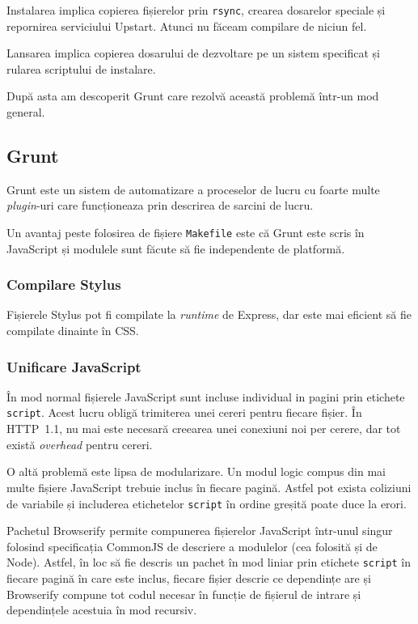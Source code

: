 \documentclass[a4wide,12pt]{report}
\newcommand{\eng}[1]{\emph{#1}} %
\newcommand{\cod}[1]{\texttt{#1}}
\begin{document}
Instalarea implica copierea fișierelor prin \cod{rsync}, crearea dosarelor
speciale și repornirea serviciului Upstart. Atunci nu făceam compilare de niciun
fel.

Lansarea implica copierea dosarului de dezvoltare pe un sistem specificat și
rularea scriptului de instalare.

După asta am descoperit Grunt care rezolvă această problemă într-un mod general.

\subsection{Grunt}

Grunt este un sistem de automatizare a proceselor de lucru cu foarte multe
\eng{plugin}-uri care funcționeaza prin descrirea de sarcini de lucru.

Un avantaj peste folosirea de fișiere \cod{Makefile} este că Grunt este scris în
JavaScript și modulele sunt făcute să fie independente de platformă.

\subsubsection{Compilare Stylus}

Fișierele Stylus pot fi compilate la \eng{runtime} de Express, dar este mai
eficient să fie compilate dinainte în CSS.

\subsubsection{Unificare JavaScript}

În mod normal fișierele JavaScript sunt incluse individual in pagini prin
etichete \cod{script}. Acest lucru obligă trimiterea unei cereri pentru fiecare
fișier. În HTTP~1.1, nu mai este necesară creearea unei conexiuni noi per
cerere, dar tot există \eng{overhead} pentru cereri.

O altă problemă este lipsa de modularizare. Un modul logic compus din mai multe
fișiere JavaScript trebuie inclus în fiecare pagină. Astfel pot exista coliziuni
de variabile și includerea etichetelor \cod{script} în ordine greșită poate duce
la erori.

Pachetul Browserify permite compunerea fișierelor JavaScript într-unul singur
folosind specificația CommonJS de descriere a modulelor (cea folosită și de
Node). Astfel, în loc să fie descris un pachet în mod liniar prin etichete
\cod{script} în fiecare pagină în care este inclus, fiecare fișier descrie ce
dependințe are și Browserify compune tot codul necesar în funcție de fișierul de
intrare și dependințele acestuia în mod recursiv.
\end{document}
